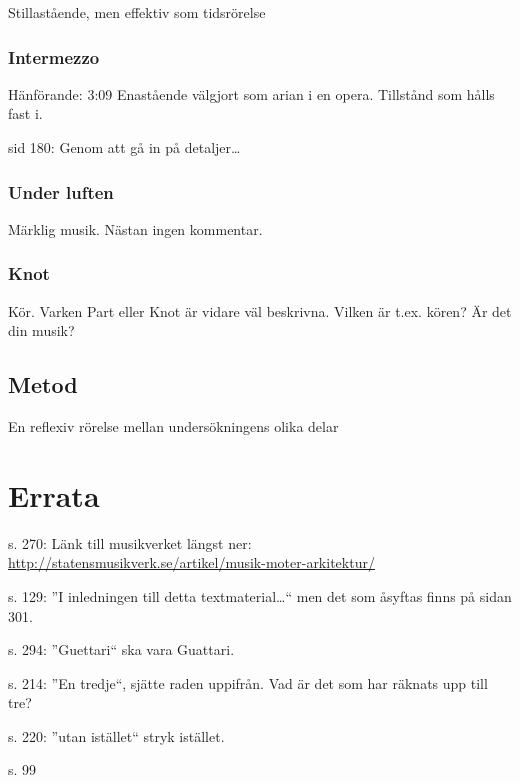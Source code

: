 \documentclass{article}
\begin{document}
Stillastående, men effektiv som tidsrörelse


\subsubsection{Intermezzo}

Hänförande: 3:09 Enastående välgjort som arian i en opera. Tillstånd som hålls fast i.

sid 180: Genom att gå in på detaljer\dots{}


\subsubsection{Under luften}

Märklig musik. Nästan ingen kommentar.




\subsubsection{Knot}

Kör. Varken Part eller Knot är vidare väl beskrivna. Vilken är t.ex. kören? Är det din musik?



\subsection{Metod}

En reflexiv rörelse mellan undersökningens olika delar






\section{Errata}

s. 270: Länk till musikverket längst ner: \url{http://statensmusikverk.se/artikel/musik-moter-arkitektur/}

s. 129: ''I inledningen till detta textmaterial\dots{}`` men det som åsyftas finns på sidan 301.

s. 294: ''Guettari`` ska vara Guattari.

s. 214: ''En tredje``, sjätte raden uppifrån. Vad är det som har räknats upp till tre?

s. 220: ''utan istället`` stryk istället.

s. 99
\end{document}
